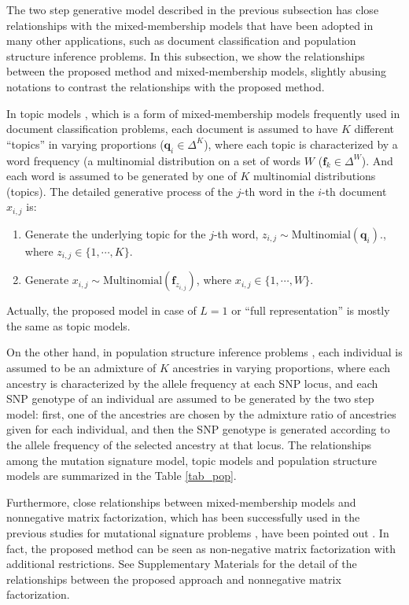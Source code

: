 The two step generative model described in the previous subsection has close relationships with
the mixed-membership models that have been adopted in many other applications, 
such as document classification and population structure inference problems. 
In this subsection, we show the relationships between the proposed method and mixed-membership models,
slightly abusing notations to contrast the relationships with the proposed method. 

In topic models \cite{Hofmann:1999,Blei:2003},
which is a form of mixed-membership models frequently used in document classification problems,
each document is assumed to have $K$ different ``topics'' in varying proportions ($\bm{q}_i \in \Delta^K$),
where each topic is characterized by a word frequency (a multinomial distribution on a set of words $W$ ($\bm{f}_k \in \Delta^W$).
And each word is assumed to be generated by one of $K$ multinomial distributions (topics).
The detailed generative process of the $j$-th word in the $i$-th document $x_{i,j}$ is:  
\begin{enumerate}
\item
Generate the underlying topic for the $j$-th word, $z_{i,j} \sim \text{Multinomial} (\bm{q}_i)$., where $z_{i,j} \in \{1,\cdots,K \}$.
\item
Generate $x_{i,j} \sim \text{Multinomial} (\bm{f}_{z_{i,j}})$, where $x_{i,j} \in \{1, \cdots, W \}$.
\end{enumerate}
Actually, the proposed model in case of $L = 1$ or ``full representation''  is mostly the same as topic models. 

On the other hand, in population structure inference problems \cite{pmid10835412, pmid19648217}, 
each individual is assumed to be an admixture of $K$ ancestries in varying proportions, 
where each ancestry is characterized by the allele frequency at each SNP locus,
and each SNP genotype of an individual are assumed to be generated by the two step model:
first, one of the ancestries are chosen by the admixture ratio of ancestries given for each individual,
and then the SNP genotype is generated according to the allele frequency of the selected ancestry at that locus.
The relationships among the mutation signature model, topic models and population structure models are summarized in the Table \ref{tab_pop}.



Furthermore, close relationships between mixed-membership models and nonnegative matrix factorization,
which has been successfully used in the previous studies for mutational signature problems \cite{pmid22608084, pmid23318258, pmid23945592},
have been pointed out \cite{ding2008equivalence}.
In fact, the proposed method can be seen as non-negative matrix factorization with additional restrictions.
See Supplementary Materials for the detail of the relationships between the proposed approach and nonnegative matrix factorization.



